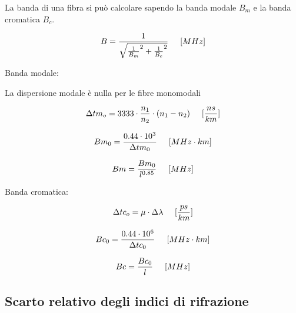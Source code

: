 \documentclass{article}
\begin{document}
    La banda di una fibra si può calcolare sapendo la banda modale $B_m$ e la banda cromatica $B_c$.

    \begin{equation}
        B = \frac{1}{
            \sqrt{
                \frac{1}{B_m}^2 +
                \frac{1}{B_c}^2
            }
        } \hspace{0.5cm} [MHz]
    \end{equation}

    Banda modale:

    La dispersione modale è nulla per le fibre monomodali    

    \begin{equation}
        \Delta tm_o = 3333 \cdot \frac{n_1}{n_2} \cdot (n_1 - n_2) \hspace{0.5cm} [\frac{ns}{km}]
    \end{equation}

    \begin{equation}
        Bm_0 = \frac{0.44 \cdot 10^3}{\Delta tm_0} \hspace{0.5cm} [MHz \cdot km]
    \end{equation}

    \begin{equation}
        Bm = \frac{Bm_0}{l^{0.85}} \hspace{0.5cm} [MHz]
    \end{equation}
    
    Banda cromatica:

    \begin{equation}
        \Delta tc_o = \mu \cdot \Delta \lambda \hspace{0.5cm} [\frac{ps}{km}]
    \end{equation}

    \begin{equation}
        Bc_0 = \frac{0.44 \cdot 10^6}{\Delta tc_0} \hspace{0.5cm} [MHz \cdot km]
    \end{equation}

    \begin{equation}
        Bc = \frac{Bc_0}{l} \hspace{0.5cm} [MHz]
    \end{equation}

    \subsection{Scarto relativo degli indici di rifrazione}
\end{document}
